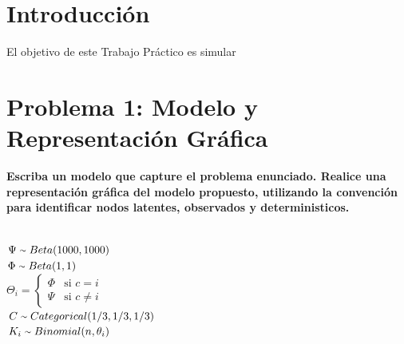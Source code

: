 \section{Introducción}

El objetivo de este Trabajo Práctico es simular

\section{Problema 1: Modelo y Representación Gráfica}

\textbf{Escriba un modelo que capture el problema enunciado. Realice una representación gráfica del modelo propuesto, utilizando la convención para identificar
nodos latentes, observados y deterministicos.}


\begin{minipage}[t]{\dimexpr\linewidth-5.5cm\relax}
    \raggedleft{}
\end{minipage}\hfill
\begin{minipage}[t]{0.7\textwidth}
  \begin{flushleft}
  \large
    ~\\
    $\Psi \; {\raise.17ex\hbox{$\scriptstyle\sim$}} \; Beta(1000, 1000)$\vspace*{0.3cm} \\
    $\Phi \; {\raise.17ex\hbox{$\scriptstyle\sim$}} \; Beta(1,1)$\vspace*{0.3cm} \\
    $\Theta_{i} = \left\{
	  \begin{array}{ll}
		  \Phi  & \mbox{si } c = i \\
		  \Psi & \mbox{si } c \neq i
	  \end{array}
    \right.$\vspace*{0.3cm} \\
    $C \; {\raise.17ex\hbox{$\scriptstyle\sim$}} \; Categorical(1/3,1/3,1/3)$\vspace*{0.3cm} \\
    $K_{i} \; {\raise.17ex\hbox{$\scriptstyle\sim$}} \; Binomial(n, \theta_{i})$  
  \end{flushleft}  
\end{minipage}

